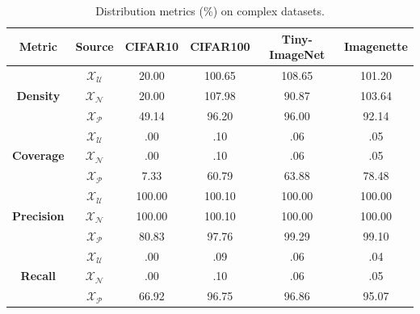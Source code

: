 \begin{table}[ht]
  \centering
  \begin{threeparttable}
    \caption{Distribution metrics (\%) on complex datasets.}
    \label{tab:abla-embeddings-coverage-objects}
    \small
    \begin{tabular}{c c c c c c}
      \toprule
      \textbf{Metric} & \textbf{Source} & \textbf{CIFAR10} & \textbf{CIFAR100} & \textbf{Tiny-ImageNet} & \textbf{Imagenette} \\
      \midrule
      & $\mathcal{X}_\mathcal{U}$ & \phantom{0}20.00 &           100.65 &           108.65 &           101.20 \\
      \textbf{Density}   & $\mathcal{X}_\mathcal{N}$ & \phantom{0}20.00 &           107.98 & \phantom{0}90.87 &           103.64 \\
      & $\mathcal{X}_\mathcal{P}$ & \phantom{0}49.14 & \phantom{0}96.20 & \phantom{0}96.00 & \phantom{0}92.14 \\
      \midrule
      & $\mathcal{X}_\mathcal{U}$ & \phantom{000}.00 & \phantom{000}.10 & \phantom{000}.06 & \phantom{000}.05 \\
      \textbf{Coverage}  & $\mathcal{X}_\mathcal{N}$ & \phantom{000}.00 & \phantom{000}.10 & \phantom{000}.06 & \phantom{000}.05 \\
      & $\mathcal{X}_\mathcal{P}$ & \phantom{00}7.33 & \phantom{0}60.79 & \phantom{0}63.88 & \phantom{0}78.48 \\
      \midrule
      & $\mathcal{X}_\mathcal{U}$ &           100.00 &           100.10 &           100.00 &           100.00 \\
      \textbf{Precision} & $\mathcal{X}_\mathcal{N}$ &           100.00 &           100.10 &           100.00 &           100.00 \\
      & $\mathcal{X}_\mathcal{P}$ & \phantom{0}80.83 & \phantom{0}97.76 & \phantom{0}99.29 & \phantom{0}99.10 \\
      \midrule
      & $\mathcal{X}_\mathcal{U}$ & \phantom{000}.00 & \phantom{000}.09 & \phantom{000}.06 & \phantom{000}.04 \\
      \textbf{Recall}    & $\mathcal{X}_\mathcal{N}$ & \phantom{000}.00 & \phantom{000}.10 & \phantom{000}.06 & \phantom{000}.05 \\
      & $\mathcal{X}_\mathcal{P}$ & \phantom{0}66.92 & \phantom{0}96.75 & \phantom{0}96.86 & \phantom{0}95.07 \\
      \bottomrule
    \end{tabular}
  \end{threeparttable}
\end{table}


